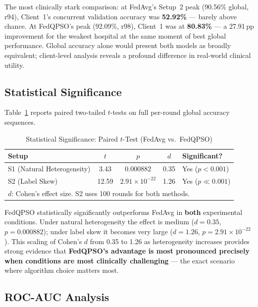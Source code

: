 \documentclass[conference]{IEEEtran}
\begin{document}
The most clinically stark comparison: at FedAvg's Setup~2 peak (90.56\%
global, r94), Client~1's concurrent validation accuracy was \textbf{52.92\%}
--- barely above chance. At FedQPSO's peak (92.09\%, r98), Client~1 was at
\textbf{80.83\%} --- a 27.91\,pp improvement for the weakest hospital at the
same moment of best global performance. Global accuracy alone would present
both models as broadly equivalent; client-level analysis reveals a profound
difference in real-world clinical utility.

\subsection{Statistical Significance}

Table~\ref{tab:stats} reports paired two-tailed $t$-tests on full per-round
global accuracy sequences.

\begin{table}[htbp]
\caption{Statistical Significance: Paired $t$-Test (FedAvg vs.\ FedQPSO)}
\label{tab:stats}
\begin{center}
\begin{tabular}{lcccl}
\hline
\textbf{Setup} & $t$ & $p$ & $d$ & \textbf{Significant?}\\
\hline
S1 (Natural Heterogeneity) & 3.43 & 0.000882 & 0.35 & Yes ($p < 0.001$)\\
S2 (Label Skew)            & 12.59 & $2.91\times10^{-22}$ & 1.26 & Yes ($p \ll 0.001$)\\
\hline
\multicolumn{5}{l}{\small $d$: Cohen's effect size. S2 uses 100 rounds for
both methods.}
\end{tabular}
\end{center}
\end{table}

FedQPSO statistically significantly outperforms FedAvg in \textbf{both}
experimental conditions. Under natural heterogeneity the effect is medium
($d = 0.35$, $p = 0.000882$); under label skew it becomes very large
($d = 1.26$, $p = 2.91\times10^{-22}$). This scaling of Cohen's $d$ from
0.35 to 1.26 as heterogeneity increases provides strong evidence that
\textbf{FedQPSO's advantage is most pronounced precisely when conditions are
most clinically challenging} — the exact scenario where algorithm choice
matters most.

\subsection{ROC-AUC Analysis}
\end{document}
